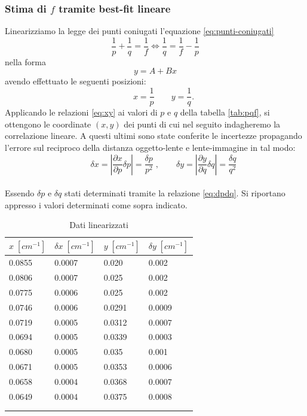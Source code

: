 \documentclass[11pt,a4paper]{article}
\begin{document}
\subsubsection{Stima di $f$ tramite best-fit lineare}
Linearizziamo la legge dei punti coniugati l'equazione \ref{eq:punti-coniugati} 
\begin{equation}
    \frac{1}{p}+\frac{1}{q}=\frac{1}{f} \Longleftrightarrow \frac{1}{q} = \frac{1}{f} - \frac{1}{p}
    \label{eq:pqf-linearized}
\end{equation}
nella forma
\begin{equation}
    y = A + Bx
    \label{eq:retta-generica}
\end{equation}
avendo effettuato le seguenti posizioni:
\begin{equation}
    \qquad{x = \frac{1}{p}}
    \qquad{y = \frac{1}{q}}.
    \label{eq:xy}
\end{equation}
Applicando le relazioni \ref{eq:xy} ai valori di $p$ e $q$ della tabella \ref{tab:pqf}, si ottengono le coordinate $(x,y)$ dei punti di cui nel seguito indagheremo la correlazione lineare. A questi ultimi sono state conferite le incertezze propagando l'errore sul reciproco della distanza oggetto-lente e lente-immagine in tal modo:
\\
\begin{equation}
    \qquad{\delta x = \left | \frac{\partial x}{\partial p} \delta p \right | = \frac{\delta p}{p^2}} \; ,
    \qquad{\delta y = \left | \frac{\partial y}{\partial q} \delta q \right | = \frac{\delta q}{q^2}}
\end{equation}
\\
Essendo $\delta p$ e $\delta q$ stati determinati tramite la relazione \ref{eq:dpdq}. Si riportano appresso i valori determinati come sopra indicato.
\\
\begin{longtable}[]{@{}llll@{}}
   \toprule
   $x \; [cm^{-1}]$ & $\delta x \; [cm^{-1}]$ & $y \; [cm^{-1}]$ & $\delta y \; [cm^{-1}]$ \tabularnewline
   \midrule
   \endhead
   0.0855 & 0.0007 & 0.020 & 0.002 \tabularnewline
   0.0806 & 0.0007 & 0.025 & 0.002 \tabularnewline
   0.0775 & 0.0006 & 0.025 & 0.002 \tabularnewline
   0.0746 & 0.0006 & 0.0291 & 0.0009 \tabularnewline
   0.0719 & 0.0005 & 0.0312 & 0.0007 \tabularnewline
   0.0694 & 0.0005 & 0.0339 & 0.0003 \tabularnewline
   0.0680 & 0.0005 & 0.035 & 0.001 \tabularnewline
   0.0671 & 0.0005 & 0.0353 & 0.0006 \tabularnewline
   0.0658 & 0.0004 & 0.0368 & 0.0007 \tabularnewline
   0.0649 & 0.0004 & 0.0375 & 0.0008 \tabularnewline
   \bottomrule
   \label{tab:linearized}
   \\
   \caption{Dati linearizzati}
\end{longtable}
\end{document}
